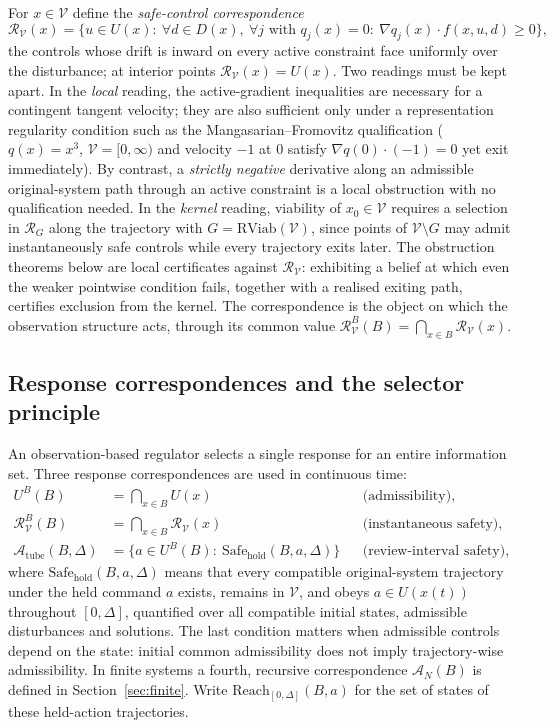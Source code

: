 \documentclass[11pt,a4paper]{article}
\theoremstyle{plain}
\theoremstyle{definition}
\theoremstyle{remark}
\newcommand{\RViab}{\mathrm{RViab}}
\newcommand{\cV}{\mathcal{V}}
\newcommand{\cR}{\mathcal{R}}
\newcommand{\cA}{\mathcal{A}}
\newcommand{\Atube}{\cA_{\mathrm{tube}}}
\newcommand{\Reach}{\mathrm{Reach}}
\begin{document}
For $x\in\cV$ define the \emph{safe-control correspondence}
\begin{equation}\label{eq:R}
\cR_\cV(x)=\bigl\{u\in U(x):\ \forall d\in D(x),\ \forall j\text{ with }q_j(x)=0:\ \nabla q_j(x)\cdot f(x,u,d)\ge0\bigr\},
\end{equation}
the controls whose drift is inward on every active constraint face uniformly over the disturbance; at interior points $\cR_\cV(x)=U(x)$. Two readings must be kept apart. In the \emph{local} reading, the active-gradient inequalities are necessary for a contingent tangent velocity; they are also sufficient only under a representation regularity condition such as the Mangasarian--Fromovitz qualification ($q(x)=x^3$, $\cV=[0,\infty)$ and velocity $-1$ at $0$ satisfy $\nabla q(0)\cdot(-1)=0$ yet exit immediately). By contrast, a \emph{strictly negative} derivative along an admissible original-system path through an active constraint is a local obstruction with no qualification needed. In the \emph{kernel} reading, viability of $x_0\in\cV$ requires a selection in $\cR_G$ along the trajectory with $G=\RViab(\cV)$, since points of $\cV\setminus G$ may admit instantaneously safe controls while every trajectory exits later. The obstruction theorems below are local certificates against $\cR_\cV$: exhibiting a belief at which even the weaker pointwise condition fails, together with a realised exiting path, certifies exclusion from the kernel. The correspondence is the object on which the observation structure acts, through its common value $\cR^B_\cV(B)=\bigcap_{x\in B}\cR_\cV(x)$.

\subsection{Response correspondences and the selector principle}\label{sec:selector}

An observation-based regulator selects a single response for an entire information set. Three response correspondences are used in continuous time:
\begin{align*}
U^B(B)&=\textstyle\bigcap_{x\in B}U(x) &&\text{(admissibility)},\\
\cR^B_\cV(B)&=\textstyle\bigcap_{x\in B}\cR_\cV(x) &&\text{(instantaneous safety)},\\
\Atube(B,\Delta)&=\{a\in U^B(B):\ \mathrm{Safe}_{\mathrm{hold}}(B,a,\Delta)\} &&\text{(review-interval safety)},
\end{align*}
where $\mathrm{Safe}_{\mathrm{hold}}(B,a,\Delta)$ means that every compatible original-system trajectory under the held command $a$ exists, remains in $\cV$, and obeys $a\in U(x(t))$ throughout $[0,\Delta]$, quantified over all compatible initial states, admissible disturbances and solutions. The last condition matters when admissible controls depend on the state: initial common admissibility does not imply trajectory-wise admissibility. In finite systems a fourth, recursive correspondence $\cA_N(B)$ is defined in Section~\ref{sec:finite}. Write $\Reach_{[0,\Delta]}(B,a)$ for the set of states of these held-action trajectories.
\end{document}
